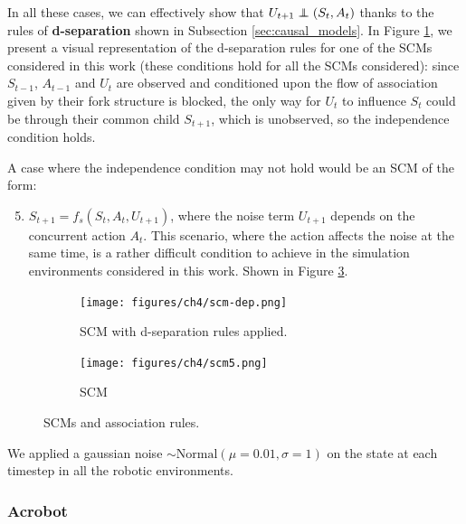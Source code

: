 In all these cases, we can effectively show that
$U_{t+1} \independent (S_t, A_t)$ thanks to the rules
of \textbf{d-separation} shown in Subsection \ref{sec:causal_models}.
In Figure \ref{fig:scm-dep}, we present a visual representation
of the d-separation rules for one of the SCMs considered in this work
(these conditions hold for all the SCMs considered):
since $S_{t-1}$, $A_{t-1}$ and $U_t$ are observed and conditioned upon
the flow of association given by their fork structure is blocked,
the only way for $U_t$ to influence $S_t$ could be
through their common child $S_{t+1}$, which is unobserved,
so the independence condition holds.

A case where the independence condition may not hold would be an
SCM of the form:
\begin{enumerate}
    \setcounter{enumi}{4}
    \item $S_{t+1} = f_s(S_t, A_t, U_{t+1})$,
    where the noise term $U_{t+1}$ depends on the concurrent action
    $A_t$. This scenario, where the action affects the noise at the same time,
    is a rather difficult condition to achieve in the simulation
    environments considered in this work. Shown in Figure \ref{fig:scm5}.
\end{enumerate}
\begin{figure}[h]
    \begin{subfigure}[t]{.41\textwidth}
        \centering
        \texttt{[image: figures/ch4/scm-dep.png]}
        \caption{SCM with d-separation rules applied.}
        \label{fig:scm-dep}
    \end{subfigure}
    \hfill
    \begin{subfigure}[t]{.41\textwidth}
        \centering
        \texttt{[image: figures/ch4/scm5.png]}
        \caption{ SCM}
        \label{fig:scm5}
    \end{subfigure}
    \caption{SCMs and association rules.}
\end{figure}

We applied a gaussian
noise $\sim \text{Normal}(\mu=0.01, \sigma=1)$ on the state at each timestep
in all the robotic environments.

\subsubsection{Acrobot}

